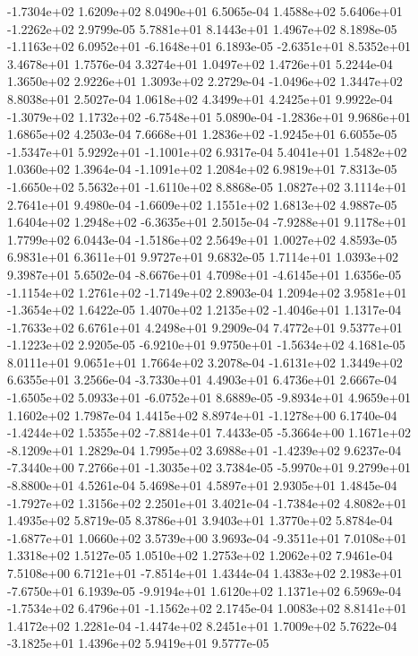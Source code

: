 -1.7304e+02  1.6209e+02  8.0490e+01  6.5065e-04
 1.4588e+02  5.6406e+01 -1.2262e+02  2.9799e-05
5.7881e+01 8.1443e+01 1.4967e+02  8.1898e-05
-1.1163e+02  6.0952e+01 -6.1648e+01  6.1893e-05
-2.6351e+01  8.5352e+01  3.4678e+01  1.7576e-04
3.3274e+01 1.0497e+02 1.4726e+01  5.2244e-04
1.3650e+02 2.9226e+01 1.3093e+02  2.2729e-04
-1.0496e+02  1.3447e+02  8.8038e+01  2.5027e-04
1.0618e+02 4.3499e+01 4.2425e+01  9.9922e-04
-1.3079e+02  1.1732e+02 -6.7548e+01  5.0890e-04
-1.2836e+01  9.9686e+01  1.6865e+02  4.2503e-04
 7.6668e+01  1.2836e+02 -1.9245e+01  6.6055e-05
-1.5347e+01  5.9292e+01 -1.1001e+02  6.9317e-04
5.4041e+01 1.5482e+02 1.0360e+02  1.3964e-04
-1.1091e+02  1.2084e+02  6.9819e+01  7.8313e-05
-1.6650e+02  5.5632e+01 -1.6110e+02  8.8868e-05
1.0827e+02 3.1114e+01 2.7641e+01  9.4980e-04
-1.6609e+02  1.1551e+02  1.6813e+02  4.9887e-05
 1.6404e+02  1.2948e+02 -6.3635e+01  2.5015e-04
-7.9288e+01  9.1178e+01  1.7799e+02  6.0443e-04
-1.5186e+02  2.5649e+01  1.0027e+02  4.8593e-05
6.9831e+01 6.3611e+01 9.9727e+01  9.6832e-05
1.7114e+01 1.0393e+02 9.3987e+01  5.6502e-04
-8.6676e+01  4.7098e+01 -4.6145e+01  1.6356e-05
-1.1154e+02  1.2761e+02 -1.7149e+02  2.8903e-04
 1.2094e+02  3.9581e+01 -1.3654e+02  1.6422e-05
 1.4070e+02  1.2135e+02 -1.4046e+01  1.1317e-04
-1.7633e+02  6.6761e+01  4.2498e+01  9.2909e-04
 7.4772e+01  9.5377e+01 -1.1223e+02  2.9205e-05
-6.9210e+01  9.9750e+01 -1.5634e+02  4.1681e-05
8.0111e+01 9.0651e+01 1.7664e+02  3.2078e-04
-1.6131e+02  1.3449e+02  6.6355e+01  3.2566e-04
-3.7330e+01  4.4903e+01  6.4736e+01  2.6667e-04
-1.6505e+02  5.0933e+01 -6.0752e+01  8.6889e-05
-9.8934e+01  4.9659e+01  1.1602e+02  1.7987e-04
 1.4415e+02  8.8974e+01 -1.1278e+00  6.1740e-04
-1.4244e+02  1.5355e+02 -7.8814e+01  7.4433e-05
-5.3664e+00  1.1671e+02 -8.1209e+01  1.2829e-04
 1.7995e+02  3.6988e+01 -1.4239e+02  9.6237e-04
-7.3440e+00  7.2766e+01 -1.3035e+02  3.7384e-05
-5.9970e+01  9.2799e+01 -8.8800e+01  4.5261e-04
5.4698e+01 4.5897e+01 2.9305e+01  1.4845e-04
-1.7927e+02  1.3156e+02  2.2501e+01  3.4021e-04
-1.7384e+02  4.8082e+01  1.4935e+02  5.8719e-05
8.3786e+01 3.9403e+01 1.3770e+02  5.8784e-04
-1.6877e+01  1.0660e+02  3.5739e+00  3.9693e-04
-9.3511e+01  7.0108e+01  1.3318e+02  1.5127e-05
1.0510e+02 1.2753e+02 1.2062e+02  7.9461e-04
 7.5108e+00  6.7121e+01 -7.8514e+01  1.4344e-04
 1.4383e+02  2.1983e+01 -7.6750e+01  6.1939e-05
-9.9194e+01  1.6120e+02  1.1371e+02  6.5969e-04
-1.7534e+02  6.4796e+01 -1.1562e+02  2.1745e-04
1.0083e+02 8.8141e+01 1.4172e+02  1.2281e-04
-1.4474e+02  8.2451e+01  1.7009e+02  5.7622e-04
-3.1825e+01  1.4396e+02  5.9419e+01  9.5777e-05
